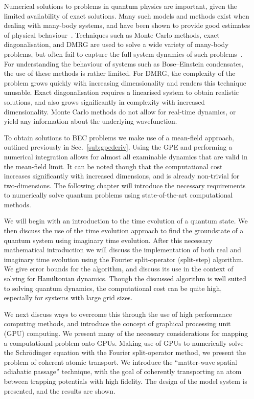 Numerical solutions to problems in quantum physics are important, given the limited availability of exact solutions. Many such models and methods exist when dealing with many-body systems, and have been shown to provide good estimates of physical behaviour~\cite{BK:Krauth_2006}. Techniques such as Monte Carlo methods, exact diagonalisation, and DMRG are used to solve a wide variety of many-body problems, but often fail to capture the full system dynamics of such problems~\cite{NUM:Schollwock_rmp_2005}. For understanding the behaviour of systems such as Bose--Einstein condensates, the use of these methods is rather limited. For DMRG, the complexity of the problem grows quickly with increasing dimensionality and renders this technique unusable. Exact diagonalisation requires a linearised system to obtain realistic solutions, and also grows significantly in complexity with increased dimensionality. Monte Carlo methods do not allow for real-time dynamics, or yield any information about the underlying wavefunction.

To obtain solutions to BEC problems we make use of a mean-field approach, outlined previously in Sec.~\ref{sub:gpederiv}. Using the GPE and performing a numerical integration allows for almost all examinable dynamics that are valid in the mean-field limit. It can be noted though that the computational cost increases significantly with increased dimensions, and is already non-trivial for two-dimensions. The following chapter will introduce the necessary requirements to numerically solve quantum problems using state-of-the-art computational methods.

We will begin with an introduction to the time evolution of a quantum state. We then discuss the use of the time evolution approach to find the groundstate of a quantum system using imaginary time evolution. After this necessary mathematical introduction we will discuss the implementation of both real and imaginary time evolution using the Fourier split-operator (split-step) algorithm. We give error bounds for the algorithm, and discuss its use in the context of solving for Hamiltonian dynamics. Though the discussed algorithm is well suited to solving quantum dynamics, the computational cost can be quite high, especially for systems with large grid sizes.

We next discuss ways to overcome this through the use of high performance computing methods, and introduce the concept of graphical processing unit (GPU) computing. We present many of the necessary considerations for mapping a computational problem onto GPUs. Making use of GPUs to numerically solve the Schr\"odinger equation with the Fourier split-operator method, we present the problem of coherent atomic transport. We introduce the ``matter-wave spatial adiabatic passage'' technique, with the goal of coherently transporting an atom between trapping potentials with high fidelity. The design of the model system is presented, and the results are shown.

